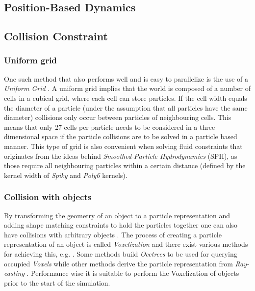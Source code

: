 \subsection{Position-Based Dynamics}



\subsection{Collision Constraint}


\subsubsection{Uniform grid}

One such method that also performs well and is easy to parallelize is the use of a \textit{Uniform Grid} \cite{Green}. A uniform grid implies that the world is composed of a number of cells in a cubical grid, where each cell can store particles. If the cell width equals the diameter of a particle (under the assumption that all particles have the same diameter) collisions only occur between particles of neighbouring cells. This means that only 27 cells per particle needs to be considered in a three dimensional space if the particle collisions are to be solved in a particle based manner. This type of grid is also convenient when solving fluid constraints that originates from the ideas behind \textit{Smoothed-Particle Hydrodynamics} (SPH), as those require all neighbouring particles within a certain distance (defined by the kernel width of \textit{Spiky} and \textit{Poly6} kernels).

\subsubsection{Collision with objects}

By transforming the geometry of an object to a particle representation and adding shape matching constraints to hold the particles together one can also have collisions with arbitrary objects \cite{muller2005meshless, macklin2014unified}. The process of creating a particle representation of an object is called \textit{Voxelization} and there exist various methods for achieving this, e.g. \cite{VoxPolygon, VoxSingle}. Some methods build \textit{Occtrees} to be used for querying occupied \textit{Voxels} while other methods derive the particle representation from \textit{Ray-casting} \cite{VoxSingle}. Performance wise it is suitable to perform the Voxelization of objects prior to the start of the simulation.


